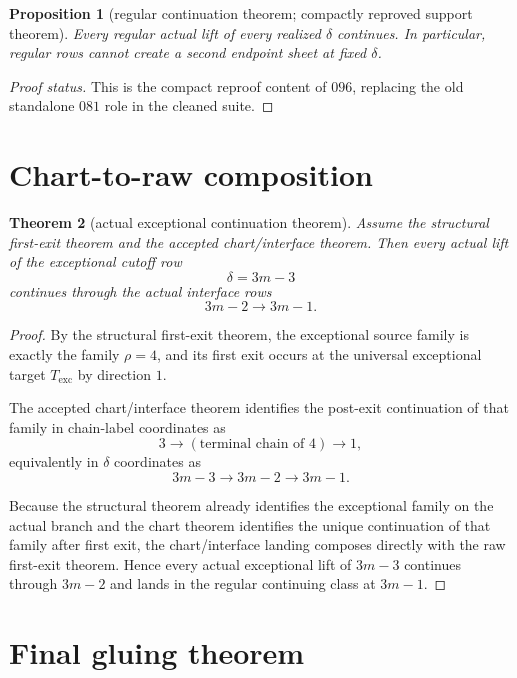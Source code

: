 \documentclass[11pt]{article}
\newtheorem{theorem}{Theorem}[section]
\newtheorem{proposition}[theorem]{Proposition}
\begin{document}
\begin{proposition}[regular continuation theorem; compactly reproved support theorem]
Every regular actual lift of every realized $\delta$ continues. In particular,
regular rows cannot create a second endpoint sheet at fixed $\delta$.
\end{proposition}

\begin{proof}[Proof status]
This is the compact reproof content of $096$, replacing the old standalone
$081$ role in the cleaned suite.
\end{proof}

\section{Chart-to-raw composition}

\begin{theorem}[actual exceptional continuation theorem]
Assume the structural first-exit theorem and the accepted chart/interface
theorem. Then every actual lift of the exceptional cutoff row
\[
\delta=3m-3
\]
continues through the actual interface rows
\[
3m-2 \to 3m-1.
\]
\end{theorem}

\begin{proof}
By the structural first-exit theorem, the exceptional source family is exactly
the family $\rho=4$, and its first exit occurs at the universal exceptional
target $T_{\mathrm{exc}}$ by direction $1$.

The accepted chart/interface theorem identifies the post-exit continuation of
that family in chain-label coordinates as
\[
3 \to (\text{terminal chain of }4)\to 1,
\]
equivalently in $\delta$ coordinates as
\[
3m-3 \to 3m-2 \to 3m-1.
\]

Because the structural theorem already identifies the exceptional family on the
actual branch and the chart theorem identifies the unique continuation of that
family after first exit, the chart/interface landing composes directly with the
raw first-exit theorem. Hence every actual exceptional lift of $3m-3$ continues
through $3m-2$ and lands in the regular continuing class at $3m-1$.
\end{proof}

\section{Final gluing theorem}
\end{document}
